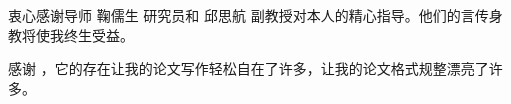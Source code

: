 

\begin{ack}
  衷心感谢导师 鞠儒生 研究员和 邱思航 副教授对本人的精心指导。他们的言传身教将使我终生受益。

  感谢 \nudtpaper{}，它的存在让我的论文写作轻松自在了许多，让我的论文格式规整漂亮了许多。

\end{ack}
